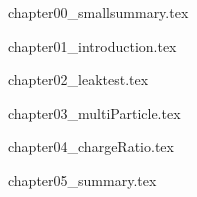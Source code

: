 \documentclass[a4paper,12pt,twoside,openany]{book}
\begin{document}

\normalsize

\tableofcontents

\clearpage{\thispagestyle{empty}\cleardoublepage}

\listoftables

\clearpage{\thispagestyle{empty}\cleardoublepage}

\listoffigures

\clearpage{\cleardoublepage}





\fancyhead[LE,RO]{\thepage}


{chapter00_smallsummary.tex}

\clearpage{\thispagestyle{empty}\cleardoublepage}

\fancyhead[LO]{\leftmark}
\fancyhead[RE]{\rightmark}
\fancyhead[LE,RO]{\thepage}

\normalsize

{chapter01_introduction.tex}

\clearpage{\thispagestyle{empty}\cleardoublepage}

{chapter02_leaktest.tex}

\clearpage{\thispagestyle{empty}\cleardoublepage}

{chapter03_multiParticle.tex}

\clearpage{\thispagestyle{empty}\cleardoublepage}

{chapter04_chargeRatio.tex}

\clearpage{\thispagestyle{empty}\cleardoublepage}

{chapter05_summary.tex}

\clearpage{\cleardoublepage}




\end{document}
